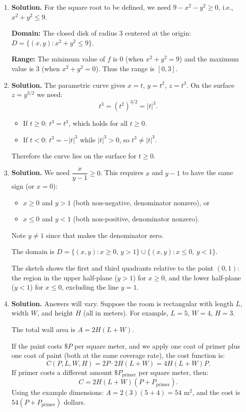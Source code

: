 \begin{enumerate}
\item \textbf{Solution.}
For the square root to be defined, we need $9 - x^2 - y^2 \geq 0$, i.e., $x^2 + y^2 \leq 9$.

\textbf{Domain:} The closed disk of radius 3 centered at the origin:
$D = \{(x,y) : x^2 + y^2 \leq 9\}$.

\textbf{Range:} The minimum value of $f$ is 0 (when $x^2 + y^2 = 9$) and the maximum value is 3 (when $x^2 + y^2 = 0$). Thus the range is $\boxed{[0,3]}$.

\item \textbf{Solution.}
The parametric curve gives $x = t$, $y = t^2$, $z = t^3$. On the surface $z = y^{3/2}$ we need:
\[
t^3 = (t^2)^{3/2} = |t|^3.
\]
\begin{itemize}
    \item If $t \geq 0$: $t^3 = t^3$, which holds for all $t \geq 0$.
    \item If $t < 0$: $t^3 = -|t|^3$ while $|t|^3 > 0$, so $t^3 \neq |t|^3$.
\end{itemize}
Therefore the curve lies on the surface for $\boxed{t \geq 0}$.

\item \textbf{Solution.}
We need $\dfrac{x}{y-1} \geq 0$. This requires $x$ and $y-1$ to have the same sign (or $x = 0$):
\begin{itemize}
    \item $x \geq 0$ and $y > 1$ (both non-negative, denominator nonzero), or
    \item $x \leq 0$ and $y < 1$ (both non-positive, denominator nonzero).
\end{itemize}
Note $y \neq 1$ since that makes the denominator zero.

The domain is $D = \{(x,y) : x \geq 0,\, y > 1\} \cup \{(x,y) : x \leq 0,\, y < 1\}$.

The sketch shows the first and third quadrants relative to the point $(0,1)$: the region in the upper half-plane ($y > 1$) for $x \geq 0$, and the lower half-plane ($y < 1$) for $x \leq 0$, excluding the line $y = 1$.

\item \textbf{Solution.}
Answers will vary. Suppose the room is rectangular with length $L$, width $W$, and height $H$ (all in meters). For example, $L = 5$, $W = 4$, $H = 3$.

The total wall area is $A = 2H(L + W)$.

If the paint costs $\$P$ per square meter, and we apply one coat of primer plus one coat of paint (both at the same coverage rate), the cost function is:
\[
C(P, L, W, H) = 2P \cdot 2H(L + W) = 4H(L+W)P.
\]
If primer costs a different amount $\$P_{\text{primer}}$ per square meter, then:
\[
C = 2H(L+W)(P + P_{\text{primer}}).
\]
Using the example dimensions: $A = 2(3)(5+4) = 54$ m$^2$, and the cost is $54(P + P_{\text{primer}})$ dollars.


\end{enumerate}
